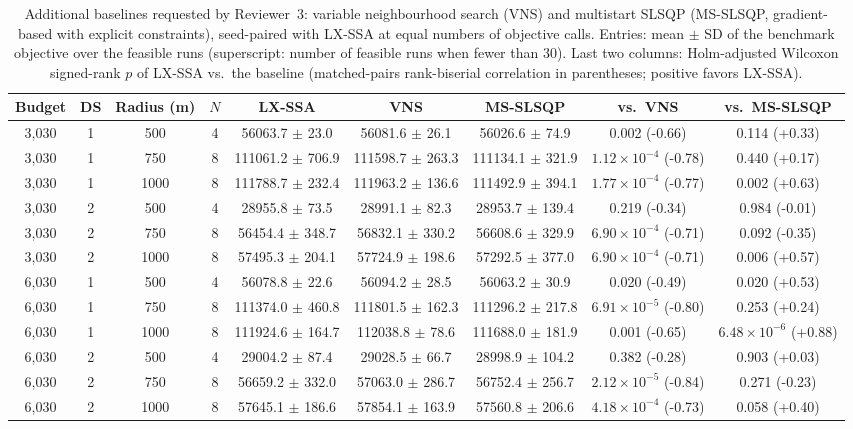 \begin{table}[!t]
\centering
\caption{Additional baselines requested by Reviewer~3: variable neighbourhood search (VNS) and multistart SLSQP (MS-SLSQP, gradient-based with explicit constraints), seed-paired with LX-SSA at equal numbers of objective calls. Entries: mean $\pm$ SD of the benchmark objective over the feasible runs (superscript: number of feasible runs when fewer than 30). Last two columns: Holm-adjusted Wilcoxon signed-rank $p$ of LX-SSA vs.\ the baseline (matched-pairs rank-biserial correlation in parentheses; positive favors LX-SSA).}
\label{tab:vns-slsqp}
\footnotesize\setlength{\tabcolsep}{3pt}
\begin{tabular}{ccccccccc}
\toprule
Budget & DS & Radius (m) & $N$ & LX-SSA & VNS & MS-SLSQP & vs.\ VNS & vs.\ MS-SLSQP \\
\midrule
3,030 & 1 & 500 & 4 & 56063.7 $\pm$ 23.0 & 56081.6 $\pm$ 26.1 & 56026.6 $\pm$ 74.9 & 0.002 (-0.66) & 0.114 (+0.33) \\
3,030 & 1 & 750 & 8 & 111061.2 $\pm$ 706.9 & 111598.7 $\pm$ 263.3 & 111134.1 $\pm$ 321.9 & $1.12\times10^{-4}$ (-0.78) & 0.440 (+0.17) \\
3,030 & 1 & 1000 & 8 & 111788.7 $\pm$ 232.4 & 111963.2 $\pm$ 136.6 & 111492.9 $\pm$ 394.1 & $1.77\times10^{-4}$ (-0.77) & 0.002 (+0.63) \\
3,030 & 2 & 500 & 4 & 28955.8 $\pm$ 73.5 & 28991.1 $\pm$ 82.3 & 28953.7 $\pm$ 139.4 & 0.219 (-0.34) & 0.984 (-0.01) \\
3,030 & 2 & 750 & 8 & 56454.4 $\pm$ 348.7 & 56832.1 $\pm$ 330.2 & 56608.6 $\pm$ 329.9 & $6.90\times10^{-4}$ (-0.71) & 0.092 (-0.35) \\
3,030 & 2 & 1000 & 8 & 57495.3 $\pm$ 204.1 & 57724.9 $\pm$ 198.6 & 57292.5 $\pm$ 377.0 & $6.90\times10^{-4}$ (-0.71) & 0.006 (+0.57) \\
\midrule
6,030 & 1 & 500 & 4 & 56078.8 $\pm$ 22.6 & 56094.2 $\pm$ 28.5 & 56063.2 $\pm$ 30.9 & 0.020 (-0.49) & 0.020 (+0.53) \\
6,030 & 1 & 750 & 8 & 111374.0 $\pm$ 460.8 & 111801.5 $\pm$ 162.3 & 111296.2 $\pm$ 217.8 & $6.91\times10^{-5}$ (-0.80) & 0.253 (+0.24) \\
6,030 & 1 & 1000 & 8 & 111924.6 $\pm$ 164.7 & 112038.8 $\pm$ 78.6 & 111688.0 $\pm$ 181.9 & 0.001 (-0.65) & $6.48\times10^{-6}$ (+0.88) \\
6,030 & 2 & 500 & 4 & 29004.2 $\pm$ 87.4 & 29028.5 $\pm$ 66.7 & 28998.9 $\pm$ 104.2 & 0.382 (-0.28) & 0.903 (+0.03) \\
6,030 & 2 & 750 & 8 & 56659.2 $\pm$ 332.0 & 57063.0 $\pm$ 286.7 & 56752.4 $\pm$ 256.7 & $2.12\times10^{-5}$ (-0.84) & 0.271 (-0.23) \\
6,030 & 2 & 1000 & 8 & 57645.1 $\pm$ 186.6 & 57854.1 $\pm$ 163.9 & 57560.8 $\pm$ 206.6 & $4.18\times10^{-4}$ (-0.73) & 0.058 (+0.40) \\
\bottomrule
\end{tabular}
\end{table}

